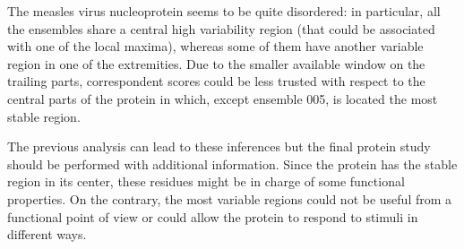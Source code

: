The measles virus nucleoprotein seems to be quite disordered: in particular, all the ensembles share a central high variability region (that could be associated with one of the local maxima), whereas some of them have another variable region in one of the extremities. Due to the smaller available window on the trailing parts, correspondent scores could be less trusted with respect to the central parts of the protein in which, except ensemble 005, is located the most stable region.

The previous analysis can lead to these inferences but the final protein study should be performed with additional information. Since the protein has the stable region in its center, these residues might be in charge of some functional properties. On the contrary, the most variable regions could not be useful from a functional point of view or could allow the protein to respond to stimuli in different ways.